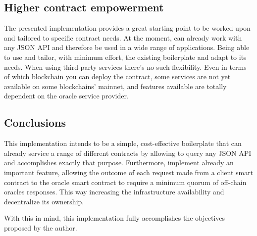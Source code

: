 \subsection{Higher contract empowerment}

The presented implementation provides a great starting point to be worked upon and tailored to specific contract needs. At the moment, can already work with any JSON API and therefore be used in a wide range of applications. Being able to use and tailor, with minimum effort, the existing boilerplate and adapt to its needs. When using third-party services there's no such flexibility. Even in terms of which blockchain you can deploy the contract, some services are not yet available on some blockchains' mainnet, and features available are totally dependent on the oracle service provider.

\subsection{Conclusions}

This implementation intends to be a simple, cost-effective boilerplate that can already service a range of different contracts by allowing to query any JSON API and accomplishes exactly that purpose. Furthermore, implement already an important feature, allowing the outcome of each request made from a client smart contract to the oracle smart contract to require a minimum quorum of off-chain oracles responses. This way increasing the infrastructure availability and decentralize its ownership.

With this in mind, this implementation fully accomplishes the objectives proposed by the author.
